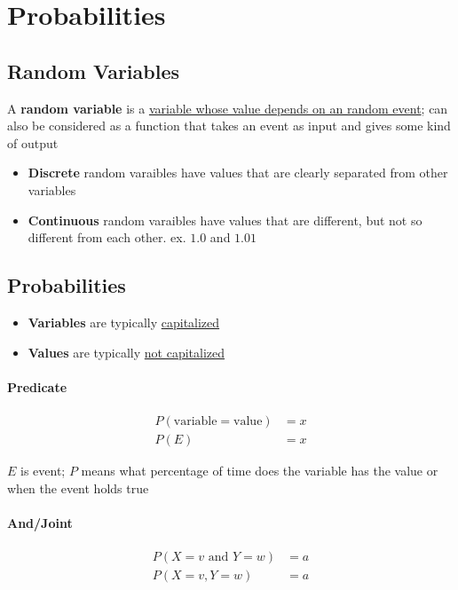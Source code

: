 \section{Probabilities}

  \subsection{Random Variables}

    A \textbf{random variable} is a \ul{variable whose value depends on an random
    event}; can also be considered as a function that takes an event as input and
    gives some kind of output

    \begin{itemize}
      \item \textbf{Discrete} random varaibles have values that are clearly
      separated from other variables
      \item \textbf{Continuous} random varaibles have values that are
      different, but not so different from each other. ex. $ 1.0 $ and $ 1.01 $
    \end{itemize}

  \subsection{Probabilities}

    \begin{itemize}
      \item \textbf{Variables} are typically \ul{capitalized}
      \item \textbf{Values} are typically \ul{not capitalized}
    \end{itemize}

    \paragraph{Predicate}
    \begin{align}
      P\left( \text{variable} = \text{value} \right) &= x \\
      P\left( E \right) &= x
    \end{align}

    $ E $ is event; $ P $ means what percentage of time does the
    variable has the value or when the event holds true

    \paragraph{And/Joint}
    \begin{align}
      P\left( X = v \text{ and } Y = w \right) &= a \\
      P\left( X = v , Y = w \right) &= a
    \end{align}

